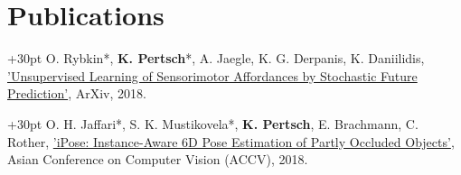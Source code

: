 \documentclass[letterpaper,11pt]{article}
\begin{document}
\section{Publications}
\hangindent+30pt 
O. Rybkin*, \textbf{K. Pertsch}*, A. Jaegle, K. G. Derpanis, K. Daniilidis, \href{https://arxiv.org/pdf/1806.09655.pdf}{'Unsupervised Learning of Sensorimotor Affordances by Stochastic Future Prediction'}, ArXiv, 2018.

\hangindent+30pt 
O. H. Jaffari*, S. K. Mustikovela*, \textbf{K. Pertsch}, E. Brachmann, C. Rother, \href{https://arxiv.org/pdf/1712.01924.pdf}{'iPose: Instance-Aware 6D Pose Estimation of Partly Occluded Objects'}, Asian Conference on Computer Vision (ACCV), 2018.



\end{document}
